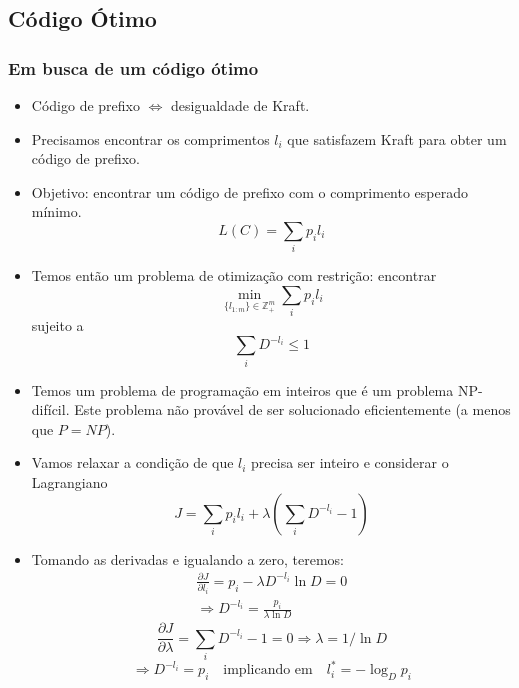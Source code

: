 \subsection{Código Ótimo}
\begin{frame}[allowframebreaks]
  \frametitle{Em busca de um código ótimo}
  \begin{itemize}
  \item Código de prefixo $\Leftrightarrow$ desigualdade de Kraft.
  \item Precisamos encontrar os comprimentos $l_i$ que satisfazem Kraft para obter um código de prefixo.
  \item Objetivo: encontrar um código de prefixo com o comprimento esperado mínimo.
	\begin{equation}
	L(C) = \sum_{i} p_i l_i
	\end{equation}
  \item Temos então um problema de otimização com restrição:
	encontrar
	\begin{equation}
	\min_{\{l_{1:m}\} \in \mathbb{Z}_{+}^m} \sum_i p_i l_i
	\end{equation}
	sujeito a
	\begin{equation}
	\sum_i D^{-l_i} \leq 1
	\end{equation}
  \item Temos um problema de programação em inteiros que é um problema NP-difícil. Este problema
	não provável de ser solucionado eficientemente (a menos que $P=NP$). 
  \item Vamos relaxar a condição de que $l_i$ precisa ser inteiro e considerar o Lagrangiano
	\begin{equation}
	J = \sum_i p_i l_i + \lambda \left( \sum_i D^{-l_i} - 1 \right)
	\end{equation}
  \item Tomando as derivadas e igualando a zero, teremos:
	\begin{eqnarray}
	\frac{\partial J}{\partial l_i} = p_i - \lambda D^{-l_i} \ln D = 0 \nonumber \\
	\Rightarrow D^{-l_i} = \frac{p_i}{\lambda \ln D}
	\end{eqnarray}
  	\begin{equation}
	\frac{\partial J}{\partial \lambda} = \sum_i D^{-l_i} - 1 = 0 \Rightarrow \lambda = 1 / \ln D
	\end{equation}
	\begin{equation}
	\Rightarrow D^{-l_i} = p_i \quad \text{implicando em} \quad l^\ast_i = -\log_D p_i
        \end{equation}

\end{itemize}
\end{frame}
